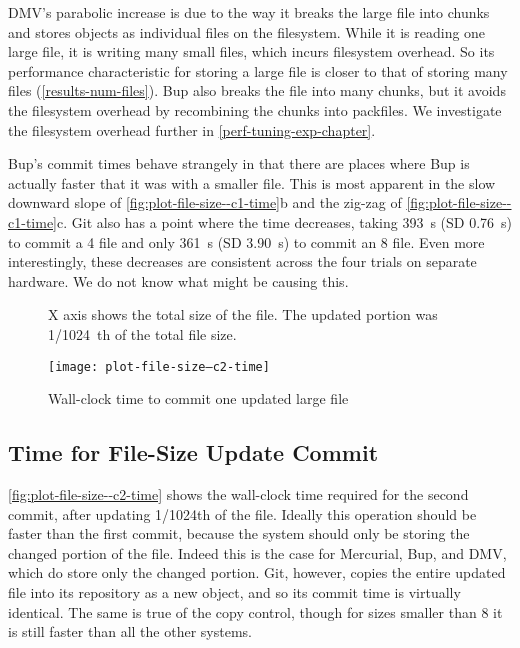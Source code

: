 DMV's parabolic increase is due to the way it breaks the large file into chunks
and stores objects as individual files on the filesystem. While it is reading
one large file, it is writing many small files, which incurs filesystem
overhead. So its performance characteristic for storing a large file is closer
to that of storing many files (\autoref{results-num-files}). Bup also breaks the
file into many chunks, but it avoids the filesystem overhead by recombining the
chunks into \glspl{packfile}. We investigate the filesystem overhead further in
\autoref{perf-tuning-exp-chapter}.

Bup's commit times behave strangely in that there are places where Bup is
actually faster that it was with a smaller file. This is most apparent in the
slow downward slope of \autoref{fig:plot-file-size--c1-time}b and the zig-zag of
\autoref{fig:plot-file-size--c1-time}c. Git also has a point where the time
decreases, taking \SI{393}{\s} (SD \SI{.76}{\s}) to commit a \SI{4}{\gib} file
and only \SI{361}{\s} (SD \SI{3.90}{\s}) to commit an \SI{8}{\gib} file. Even
more interestingly, these decreases are consistent across the four trials on
separate hardware. We do not know what might be causing this.

%


\begin{figure}[p]
    \begin{leftfullpage}
        \caption{Wall-clock time to commit one updated large file}
        \label{fig:plot-file-size--c2-time}
        \centering

        X axis shows the total size of the file. The updated portion was
        \SI{1/1024}{th} of the total file size.
        \explainlogsubfig

        \texttt{[image: plot-file-size--c2-time]}
    \end{leftfullpage}
\end{figure}

\cleardoublepage

\subsection{Time for File-Size Update Commit}
\label{results-file-size--c2-time}

\autoref{fig:plot-file-size--c2-time} shows the wall-clock time required for the
second \gls{commit}, after updating \num{1/1024}th of the file. Ideally this
operation should be faster than the first \gls{commit}, because the system
should only be storing the changed portion of the file. Indeed this is the case
for Mercurial, Bup, and \gls{DMV}, which do store only the changed portion. Git,
however, copies the entire updated file into its \gls{repository} as a new
object, and so its \gls{commit} time is virtually identical. The same is true of
the copy control, though for sizes smaller than \SI{8}{\gib} it is still faster
than all the other systems.

